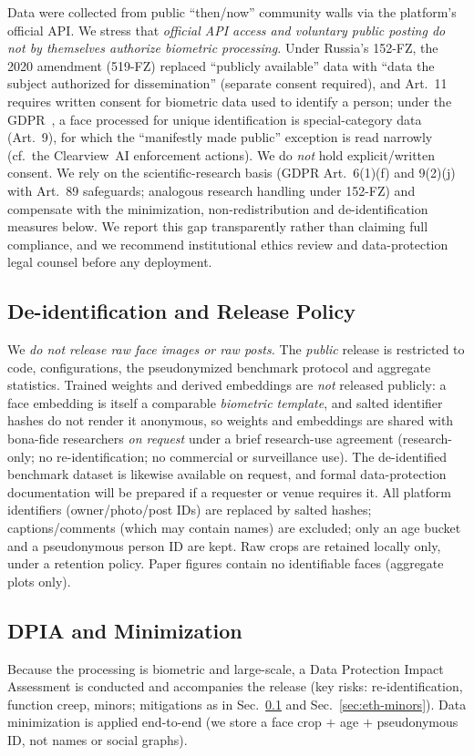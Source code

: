 \documentclass[journal]{IEEEtran}
\begin{document}
Data were collected from public ``then/now'' community walls via the platform's official API. We stress that \emph{official API access and voluntary public posting do not by themselves authorize biometric processing.} Under Russia's 152-FZ, the 2020 amendment (519-FZ) replaced ``publicly available'' data with ``data the subject authorized for dissemination'' (separate consent required), and Art.~11 requires written consent for biometric data used to identify a person; under the GDPR~\cite{gdpr2016}, a face processed for unique identification is special-category data (Art.~9), for which the ``manifestly made public'' exception is read narrowly (cf.\ the Clearview~AI enforcement actions). We do \emph{not} hold explicit/written consent. We rely on the scientific-research basis (GDPR Art.~6(1)(f) and 9(2)(j) with Art.~89 safeguards; analogous research handling under 152-FZ) and compensate with the minimization, non-redistribution and de-identification measures below. We report this gap transparently rather than claiming full compliance, and we recommend institutional ethics review and data-protection legal counsel before any deployment.

\subsection{De-identification and Release Policy}\label{sec:eth-deid}
We \emph{do not release raw face images or raw posts.} The \emph{public} release is restricted to code, configurations, the pseudonymized benchmark protocol and aggregate statistics. Trained weights and derived embeddings are \emph{not} released publicly: a face embedding is itself a comparable \emph{biometric template}, and salted identifier hashes do not render it anonymous, so weights and embeddings are shared with bona-fide researchers \emph{on request} under a brief research-use agreement (research-only; no re-identification; no commercial or surveillance use). The de-identified benchmark dataset is likewise available on request, and formal data-protection documentation will be prepared if a requester or venue requires it. All platform identifiers (owner/photo/post IDs) are replaced by salted hashes; captions/comments (which may contain names) are excluded; only an age bucket and a pseudonymous person ID are kept. Raw crops are retained locally only, under a retention policy. Paper figures contain no identifiable faces (aggregate plots only).

\subsection{DPIA and Minimization}\label{sec:eth-dpia}
Because the processing is biometric and large-scale, a Data Protection Impact Assessment is conducted and accompanies the release (key risks: re-identification, function creep, minors; mitigations as in Sec.~\ref{sec:eth-deid} and Sec.~\ref{sec:eth-minors}). Data minimization is applied end-to-end (we store a face crop $+$ age $+$ pseudonymous ID, not names or social graphs).
\end{document}

